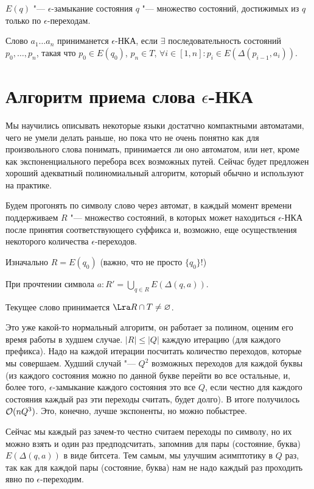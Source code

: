 \begin{Def}
$E(q)$ "--- $\epsilon$-замыкание состояния $q$ "--- множество состояний, достижимых из $q$ только по $\epsilon$-переходам.
\end{Def}


\begin{Def}
Слово $a_1 \dots a_n$ приниманется $\epsilon$-НКА, если $\exists$ последовательность состояний $p_0, \dots, p_n$, такая что
$p_0 \in E(q_0)$, $p_n \in T$, $\forall i \in [1, n]: p_i \in E(\Delta(p_{i-1}, a_i))$.
\end{Def}

\section{Алгоритм приема слова \texorpdfstring{$\epsilon$}{epsilon}-НКА}
Мы научились описывать некоторые языки достатчно компактными автоматами, чего не умели делать раньше, но пока что не очень понятно как для произвольного слова понимать, принимается ли оно автоматом, или нет,
кроме как экспоненциального перебора всех возможных путей. Сейчас будет предложен хороший адекватный полиномиальный алгоритм, который обычно и используют на практике.

Будем прогонять по символу слово через автомат, в каждый момент времени поддерживаем $R$ "---  множество состояний, в которых может находиться $\epsilon$-НКА после принятия соответствующего суффикса и,
возможно, еще осуществления некоторого количества $\epsilon$-переходов. 

Изначально $R = E(q_0)$ (важно, что не просто $\{q_0\}$!)

При прочтении символа $a\colon R' =  \bigcup\limits_{q \in R} E(\Delta(q, a))$.

Текущее слово принимается $\Lra R \cap T \neq \varnothing$.

Это уже какой-то нормальный алгоритм, он работает за полином, оценим его время работы в худшем случае.
$|R| \leqslant |Q|$ каждую итерацию (для каждого префикса). 
Надо на каждой итерации посчитать количество переходов, которые мы совершаем.
Худший случай "--- $Q^2$ возможных переходов для каждой буквы 
(из каждого состояния можно по данной букве перейти во все остальные, и, более того, $\epsilon$-замыкание каждого состояния это все $Q$, если честно для каждого состояния каждый раз эти переходы считать, будет долго).
В итоге получилось $\mathcal{O}(nQ^3)$. Это, конечно, лучше экспоненты, но можно побыстрее.

Сейчас мы каждый раз зачем-то честно считаем переходы по символу, но их можно взять и один раз предподсчитать, запомнив для пары (состояние, буква) $E(\Delta(q, a))$ в виде битсета. 
Тем самым, мы улучшим асимптотику в $Q$ раз, так как для каждой пары (состояние, буква) нам не надо каждый раз проходить явно по $\epsilon$-переходим.

